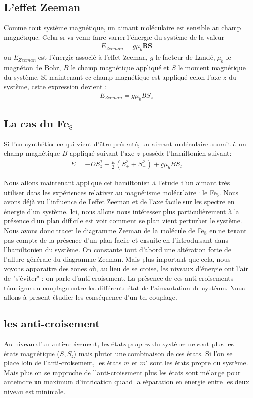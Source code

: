 \subsection{L'effet Zeeman}
Comme tout système magnétique, un aimant moléculaire est sensible au champ magnétique. Celui si va venir faire varier l'énergie du système de la valeur
\begin{eqnarray}
E_{Zeeman}= g\mu_b \mathbf{BS} \nonumber
\end{eqnarray}
ou $E_{Zeeman}$ est l'énergie associé à l'effet Zeeman, $g$ le facteur de Landé, $\mu_b$ le magnéton de Bohr, $B$ le champ magnétique appliqué et $S$ le moment magnétique du système. Si maintenant ce champ magnétique est appliqué celon l'axe $z$ du système, cette expression devient :
\begin{eqnarray}
E_{Zeeman}= g\mu_b B S_z \nonumber
\end{eqnarray}

\subsection{La cas du Fe$_8$}
Si l'on synthétise ce qui vient d'\^etre présenté, un aimant moléculaire soumit à un champ magnétique $B$ appliqué suivant l'axe $z$ possède l'hamiltonien suivant:
\begin{eqnarray}
E =  -DS_z^2 + \frac{E}{2} ( S_+^2  + S_-^2) + g\mu_b B S_z 
\end{eqnarray}


Nous allons maintenant appliqué cet hamiltonien à l'étude d'un aimant très utiliser dans les expériences relativer au magnétisme moléculaire : le Fe$_8$. Nous avons déjà vu l'influence de l'effet Zeeman et de l'axe facile sur les spectre en énergie d'un système. Ici, nous allons nous intéresser plus particulièrement à la présence d'un plan difficile est voir comment se plan vient perturber le système. Nous avons donc tracer le diagramme Zeeman de la molécule de Fe$_8$ en ne tenant pas compte de la présence d'un plan facile et ensuite en l'introduisant dans l'hamiltonien du système. On constante tout d'abord une altération forte de l'allure générale du diagramme Zeeman. Mais plus important que cela, nous voyons apparaitre des zones où, au lieu de se croise, les niveaux d'énergie ont l'air de "s'éviter" : on parle d'anti-croisement. La présence de ces anti-croisements témoigne du couplage entre les différents état de l'aimantation du système. Nous allons à present étudier les conséquence d'un tel couplage.

\subsection{les anti-croisement}
Au niveau d'un anti-croisement, les états propres du système ne sont plus les états magnétique ($S,S_z$) mais plutot une combinaison de ces états. Si l'on se place loin de l'anti-croisement, les états $m$ et $m'$ sont les états propre du système. Mais plus on se rapproche de l'anti-croisement plus les états sont mélange pour anteindre un maximum d'intrication quand la séparation en énergie entre les deux niveau est minimale.


